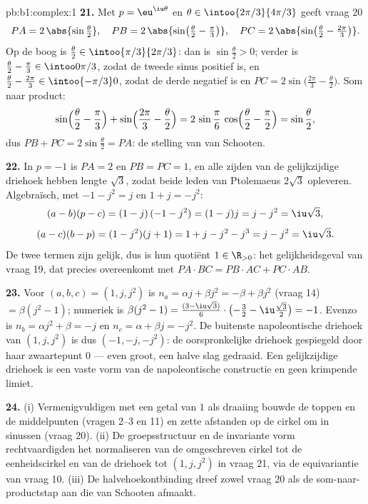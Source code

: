 \begin{solution}{pb:b1:complex:1}
\textbf{21.} Met $p = \eu^{\iu\theta}$ en $\theta \in
\intoo{2\pi/3}{4\pi/3}$ geeft vraag 20
\[
PA = 2\,\abs{\sin\tfrac\theta2},
\quad
PB = 2\,\abs{\sin\bigl(\tfrac\theta2 - \tfrac\pi3\bigr)},
\quad
PC = 2\,\abs{\sin\bigl(\tfrac\theta2 - \tfrac{2\pi}3\bigr)} .
\]
Op de boog is $\frac\theta2 \in \intoo{\pi/3}{2\pi/3}$: dan is
$\sin\frac\theta2 > 0$; verder is $\frac\theta2 - \frac\pi3 \in
\intoo0{\pi/3}$, zodat de tweede sinus positief is, en $\frac\theta2 -
\frac{2\pi}3 \in \intoo{-\pi/3}0$, zodat de derde negatief is en $PC =
2\sin\bigl(\frac{2\pi}3 - \frac\theta2\bigr)$. Som naar product:
\[
\sin\Bigl(\frac\theta2 - \frac\pi3\Bigr) +
\sin\Bigl(\frac{2\pi}3 - \frac\theta2\Bigr)
= 2\,\sin\frac\pi6\,\cos\Bigl(\frac\theta2 - \frac\pi2\Bigr)
= \sin\frac\theta2 ,
\]
dus $PB + PC = 2\sin\frac\theta2 = PA$: de stelling van van Schooten.

\textbf{22.} In $p = -1$ is $PA = 2$ en $PB = PC = 1$, en alle zijden van
de gelijkzijdige driehoek hebben lengte $\sqrt3$, zodat beide leden van
Ptolemaeus $2\sqrt3$ opleveren. Algebraïsch, met $-1 - j^2 = j$ en $1 + j
= -j^2$:
\[
(a - b)(p - c) = (1 - j)\,(-1 - j^2) = (1 - j)j = j - j^2
= \iu\sqrt3 ,
\]
\[
(a - c)(b - p) = (1 - j^2)(j + 1) = 1 + j - j^2 - j^3
= j - j^2 = \iu\sqrt3 .
\]
De twee termen zijn gelijk, dus is hun quotiënt $1 \in \R_{>0}$: het
gelijkheidsgeval van vraag 19, dat precies overeenkomt met $PA \cdot BC =
PB \cdot AC + PC \cdot AB$.

\textbf{23.} Voor $(a, b, c) = (1, j, j^2)$ is $n_a = \alpha j + \beta
j^2 = -\beta + \beta j^2$ (vraag 14) $= \beta(j^2 - 1)$; numeriek is
$\beta(j^2 - 1) = \frac{(3 - \iu\sqrt3)}6 \cdot \bigl(-\frac32 -
\iu\frac{\sqrt3}2\bigr) = -1$. Evenzo is $n_b = \alpha j^2 + \beta = -j$
en $n_c = \alpha + \beta j = -j^2$. De buitenste napoleontische driehoek
van $(1, j, j^2)$ is dus $(-1, -j, -j^2)$: de oorspronkelijke driehoek
gespiegeld door haar zwaartepunt $0$ --- even groot, een halve slag
gedraaid. Een gelijkzijdige driehoek is een vaste vorm van de
napoleontische constructie en geen krimpende limiet.

\textbf{24.} (i) Vermenigvuldigen met een getal van  $1$ als
draaiing bouwde de toppen en de middelpunten (vragen 2--3 en 11) en zette
afstanden op de cirkel om in sinussen (vraag 20). (ii) De
groepsstructuur en de invariante vorm rechtvaardigden het normaliseren
van de omgeschreven cirkel tot de eenheidscirkel en van de driehoek tot
$(1, j, j^2)$ in vraag 21, via de equivariantie van vraag 10. (iii) De
halvehoekontbinding dreef zowel vraag 20 als de som-naar-productstap aan
die van Schooten afmaakt.


\end{solution}
